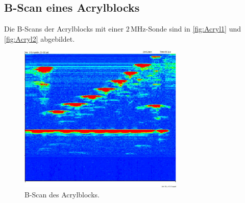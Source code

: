 \subsection{B-Scan eines Acrylblocks}
Die B-Scans der Acrylblocks mit einer $2\,\unit{\mega\hertz}$-Sonde sind in \autoref{fig:Acryl1} und
\autoref{fig:Acryl2} abgebildet.
\begin{figure}
  \centering
  \includegraphics[width=0.7\textwidth]{messwerte/BScanAcrylBlock/2Mhz.jpg}
  \caption{B-Scan des Acrylblocks.}
  \label{fig:Acryl1}
\end{figure}


